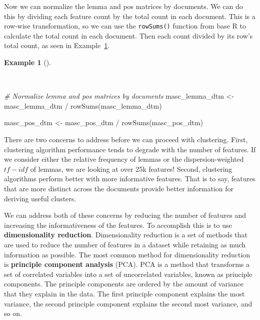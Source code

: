 \documentclass[
  letterpaper,
  DIV=11,
  numbers=noendperiod]{scrreport}
\newenvironment{Shaded}{\begin{snugshade}}{\end{snugshade}}
\newcommand{\CommentTok}[1]{\textcolor[rgb]{0.00,0.00,0.00}{\textit{#1}}}
\newcommand{\FunctionTok}[1]{\textcolor[rgb]{0.00,0.00,0.00}{#1}}
\newcommand{\NormalTok}[1]{\textcolor[rgb]{0.00,0.00,0.00}{#1}}
\newcommand{\OtherTok}[1]{\textcolor[rgb]{0.00,0.00,0.00}{#1}}
\newcommand{\SpecialCharTok}[1]{\textcolor[rgb]{0.00,0.00,0.00}{#1}}
\theoremstyle{definition}
\newtheorem{example}{Example}[chapter]
\theoremstyle{remark}
\begin{document}
Now we can normalize the lemma and pos matrices by documents. We can do
this by dividing each feature count by the total count in each document.
This is a row-wise transformation, so we can use the \texttt{rowSums()}
function from base R to calculate the total count in each document. Then
each count divided by its row's total count, as seen in
Example~\ref{exm-eda-masc-dtms-normalized}.

\begin{example}[]\protect\hypertarget{exm-eda-masc-dtms-normalized}{}\label{exm-eda-masc-dtms-normalized}

~

\begin{Shaded}
\begin{Highlighting}[]
\CommentTok{\# Normalize lemma and pos matrices by documents}
\NormalTok{masc\_lemma\_dtm }\OtherTok{\textless{}{-}} 
\NormalTok{  masc\_lemma\_dtm }\SpecialCharTok{/} \FunctionTok{rowSums}\NormalTok{(masc\_lemma\_dtm)}

\NormalTok{masc\_pos\_dtm }\OtherTok{\textless{}{-}} 
\NormalTok{  masc\_pos\_dtm }\SpecialCharTok{/} \FunctionTok{rowSums}\NormalTok{(masc\_pos\_dtm)}
\end{Highlighting}
\end{Shaded}

\end{example}

There are two concerns to address before we can proceed with clustering.
First, clustering algorithm performance tends to degrade with the number
of features. If we consider either the relative frequency of lemmas or
the dispersion-weighted \(tf-idf\) of lemmas, we are looking at over 25k
features! Second, clustering algorithms perform better with more
informative features. That is to say, features that are more distinct
across the documents provide better information for deriving useful
clusters.

We can address both of these concerns by reducing the number of features
and increasing the informativeness of the features. To accomplish this
is to use \textbf{dimensionality reduction}. Dimensionality reduction is
a set of methods that are used to reduce the number of features in a
dataset while retaining as much information as possible. The most common
method for dimensionality reduction is \textbf{principle component
analysis} (PCA). PCA is a method that transforms a set of correlated
variables into a set of uncorrelated variables, known as principle
components. The principle components are ordered by the amount of
variance that they explain in the data. The first principle component
explains the most variance, the second principle component explains the
second most variance, and so on.
\end{document}
